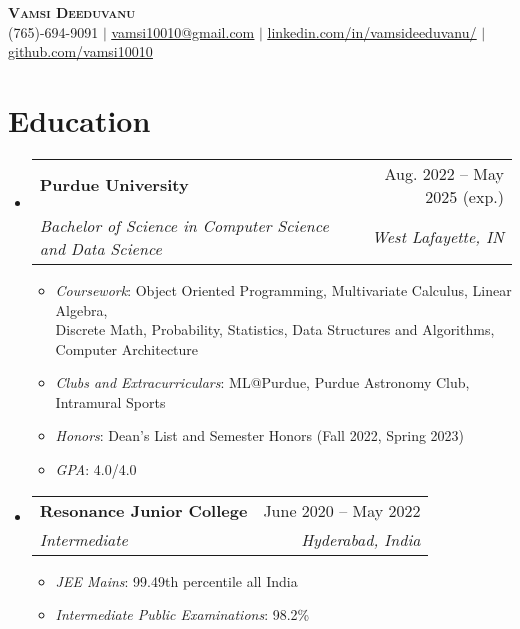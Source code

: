 \documentclass[letterpaper,11pt]{article}
\makeatletter
\newcommand{\resumeItem}[1]{
  \item\small{
    {#1 \vspace{-2pt}}
  }
}
\newcommand{\resumeSubheading}[4]{
  \vspace{-2pt}\item
    \begin{tabular*}{0.97\textwidth}[t]{l@{\extracolsep{\fill}}r}
      \textbf{\small#1} & \small#2 \\
      \textit{\small#3} & \textit{\small #4} \\
    \end{tabular*}\vspace{-7pt}
}
\newcommand{\resumeSubHeadingListStart}{\begin{itemize}[leftmargin=0.15in, label={}]}
\newcommand{\resumeSubHeadingListEnd}{\end{itemize}}
\newcommand{\resumeItemListStart}{\begin{itemize}}
\newcommand{\resumeItemListEnd}{\end{itemize}\vspace{-5pt}}
\makeatother
\begin{document}

\begin{center}
    \textbf{\Huge \scshape Vamsi Deeduvanu} \\ \vspace{1pt}
    \small (765)-694-9091 $|$ \href{mailto:vamsi10010@gmail.com}{\underline{vamsi10010@gmail.com}} $|$ 
    \href{https://linkedin.com/in/vamsideeduvanu}{\underline{linkedin.com/in/vamsideeduvanu/}} $|$
    \href{https://github.com/vamsi10010}{\underline{github.com/vamsi10010}}
\end{center}



\section{Education}
  \resumeSubHeadingListStart
    \resumeSubheading
      {Purdue University}{Aug. 2022 -- May 2025 (exp.)}
      {Bachelor of Science in Computer Science and Data Science}{West Lafayette, IN}
      \resumeItemListStart
        \resumeItem{\textit{Coursework}: Object Oriented Programming, Multivariate Calculus, Linear Algebra, 
        \\Discrete Math, Probability, Statistics, Data Structures and Algorithms, Computer Architecture
        }
        \resumeItem{\textit{Clubs and Extracurriculars}: ML@Purdue, Purdue Astronomy Club, Intramural Sports}
        \resumeItem{\textit{Honors}: Dean's List and Semester Honors (Fall 2022, Spring 2023)}
        \resumeItem{\textit{GPA}: 4.0/4.0}
      \resumeItemListEnd
    \resumeSubheading
      {Resonance Junior College}{June 2020 -- May 2022}
      {Intermediate}{Hyderabad, India}
      \resumeItemListStart
      \resumeItem{\textit{JEE Mains}: 99.49th percentile all India}
      \resumeItem{\textit{Intermediate Public Examinations}: 98.2\%}
    \resumeItemListEnd
  \resumeSubHeadingListEnd
\end{document}
